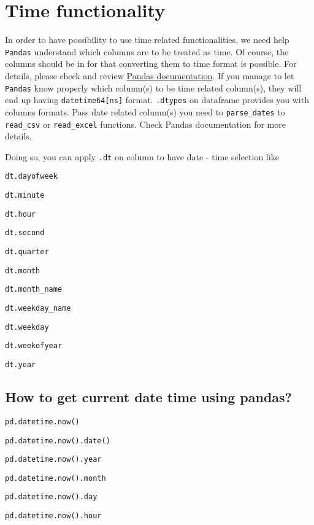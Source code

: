 \documentclass[11pt]{article}
\begin{document}
\section{Time functionality}

\label{time-functionality}

In order to have possibility to use time related functionalities,
we need help \texttt{Pandas} understand which columns are to be treated
as time. Of course, the columns should be in for that converting them
to time format is possible. For details, please check and review \href{http://pandas.pydata.org/pandas-docs/stable}{Pandas documentation}.
If you manage to let \texttt{Pandas} know properly which column(s)
to be time related column(s), they will end up having \texttt{datetime64{[}ns{]}}
format. \texttt{.dtypes} on dataframe provides you with columns formats.
Pass date related column(s) you need to \texttt{parse\_dates} to \texttt{read\_csv}
or \texttt{read\_excel} functions. Check Pandas documentation for
more details.

Doing so, you can apply \texttt{.dt} on column to have date - time
selection like 

\texttt{dt.dayofweek}

\texttt{dt.minute}

\texttt{dt.hour}

\texttt{dt.second}

\texttt{dt.quarter}

\texttt{dt.month}

\texttt{dt.month\_name}

\texttt{dt.weekday\_name}

\texttt{dt.weekday}

\texttt{dt.weekofyear}

\texttt{dt.year}

\subsection{How to get current date time using pandas?}

\label{how-to-get-current-date-time-using-pandas}

\texttt{pd.datetime.now()} 

\texttt{pd.datetime.now().date()}

\texttt{pd.datetime.now().year}

\texttt{pd.datetime.now().month} 

\texttt{pd.datetime.now().day}

\texttt{pd.datetime.now().hour}
\end{document}
